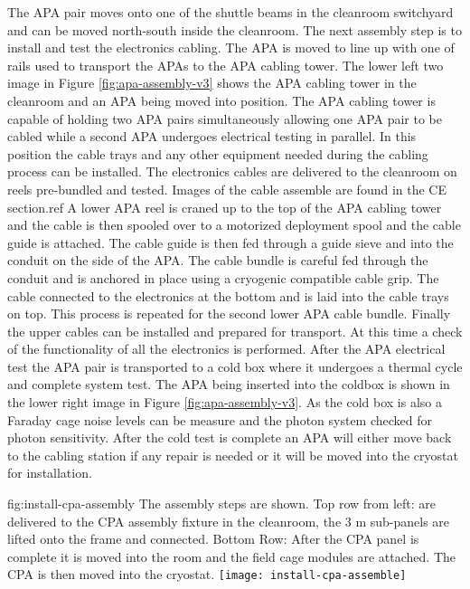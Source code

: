 The APA pair moves onto one of the shuttle beams in the cleanroom switchyard and can be moved north-south inside the cleanroom. The next assembly step is to install and test the electronics cabling. The APA is moved to line up with one of rails used to transport the APAs to the APA cabling tower. The lower left two image in Figure \ref{fig:apa-assembly-v3} shows the APA cabling tower in the cleanroom and an APA being moved into position. The APA cabling tower is capable of holding two APA pairs simultaneously allowing one APA pair to be cabled while a second APA undergoes electrical testing in parallel. In this position the cable trays and any other equipment needed during the cabling process can be installed. The electronics cables are delivered to the cleanroom on reels pre-bundled and tested. Images of the cable assemble are found in the CE section.ref{} A lower APA reel is craned up to the top of the APA cabling tower and the cable is then spooled over to a motorized deployment spool and the cable guide is attached.  The cable guide is then fed through a guide sieve and into the conduit on the side of the APA. The cable bundle is careful fed through the conduit and is anchored in place using a cryogenic compatible cable grip. The cable connected to the electronics at the bottom and is laid into the cable trays on top. This process is repeated for the second lower APA cable bundle. Finally the upper cables can be installed and prepared for transport. At this time a check of the functionality of all the electronics is performed. After the APA electrical test the APA pair is transported to a cold box where it undergoes a thermal cycle and complete system test. The APA being inserted into the coldbox is shown in the lower right image in Figure \ref{fig:apa-assembly-v3}. As the cold box is also a Faraday cage noise levels can be measure and the photon system checked for photon sensitivity. After the cold test is complete an APA will either move back to the cabling station if any repair is needed or it will be moved into the cryostat for installation. 



\begin{dunefigure}{fig:install-cpa-assembly}
  {The  assembly steps are shown. Top row from left:   are delivered to the CPA assembly fixture in the cleanroom, the 3 \si{m} sub-panels are lifted onto the frame and connected. Bottom Row: After the CPA panel is complete it is moved into the room and the field cage modules are attached. The CPA is then moved into the cryostat.}
\texttt{[image: install-cpa-assemble]}
\end{dunefigure}

